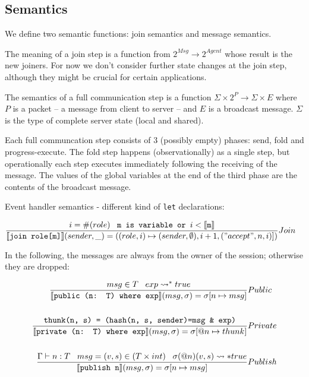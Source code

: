 \documentclass[acmsmall,review,anonymous]{acmart}\settopmatter{printfolios=true}
\begin{document}
\subsection{Semantics}


We define two semantic functions: join semantics and message semantics.

The meaning of a join step is a function from $2^{Msg} \rightarrow 2^{Agent}$ whose result is the new joiners.
For now we don't consider further state changes at the join step, although they might be crucial for certain applications.

The semantics of a full communication step is a function $\Sigma \times 2^{P} \rightarrow \Sigma \times E $ where $P$ is a packet -- a message from 
client to server -- and $E$ is a broadcast message. $\Sigma$ is the type of complete server state (local and shared).

Each full communcation step consists of 3 (possibly empty) phases: send, fold and progress-execute.
The fold step happens (observationally) as a single step, but operationally each step executes immediately following the receiving of the message.
The values of the global variables at the end of the third phase are the contents of the broadcast message.

Event handler semantics - different kind of \texttt{let} declarations:

\newcommand{\owner}{\mathbb{R}}
\begin{align*}
	\judge{&Join}{
		i = \#(role) \;\;\; \texttt{m is variable or } i < \semfunc[m]
	}{
		\semfunc[{join role[m]}](sender, \_) = ((role, i) \mapsto (sender, \emptyset), i+1, ("accept", n, i)])
	}
\end{align*}

In the following, the messages are always from the owner of the session; otherwise they are dropped:

\begin{align*}
	\judge{&Public}{
		msg \in T \; \; \; exp \leadsto^* true
	}{
		\semfunc[public (n: T) where exp](msg, \sigma) = \sigma [n \mapsto msg]
	}\\	\\
	\judge{&Private}{
		\texttt{thunk(n, s) = (hash(n, s, sender)=msg \& exp)}
	}{
		\semfunc[private (n: T) where exp](msg, \sigma) = \sigma [@n \mapsto thunk]
	}\\	\\
	\judge{&Publish}{
		\Gamma \vdash n : T \;\;\; msg = (v, s) \in (T \times int) \;\;\; \sigma(@n)(v, s) \leadsto* true
	}{
		\semfunc[publish n](msg, \sigma) = \sigma [n \mapsto msg]
	}
\end{align*}
\end{document}

